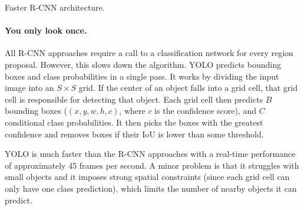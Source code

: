 \begin{marginfigure}
    \centering
    \caption{Faster R-CNN architecture.}
    \label{fig:faster-r-cnn}
\end{marginfigure}

\paragraph{You only look once.}

All R-CNN approaches require a call to a classification network for every region
proposal. However, this slows down the algorithm. YOLO \citep{redmon2016you}
predicts bounding boxes and class probabilities in a single pass.
It works by dividing the input image into an $S\times S$ grid. If the center of
an object falls into a grid cell, that grid cell is responsible for detecting
that object. Each grid cell then predicts $B$ bounding boxes ($(x,y,w,h,c)$,
where $c$ is the confidence score), and $C$ conditional class
probabilities. It then picks the boxes with the greatest
confidence and removes boxes if their IoU is lower than some threshold.

YOLO is much faster than the R-CNN approaches with a real-time performance of
approximately 45 frames per second. A minor problem is that it struggles with
small objects and it imposes strong spatial constraints (since each grid cell
can only have one class prediction), which limits the number of nearby objects
it can predict.
